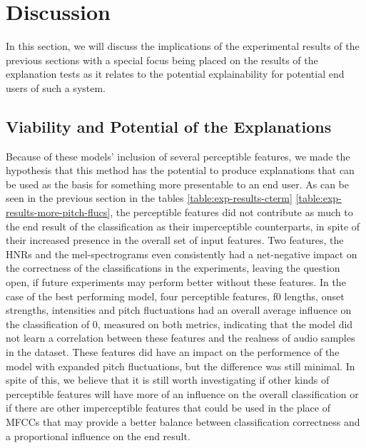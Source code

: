 \documentclass{article}
\begin{document}
	\section{Discussion}
	In this section, we will discuss the implications of the experimental results of the previous
	sections with a special focus being placed on the results of the explanation tests as it
	relates to the potential explainability for potential end users of such a system.
		\subsection{Viability and Potential of the Explanations}
		Because of these models' inclusion of several perceptible features, we made the hypothesis
		that this method has the potential to produce explanations that can be used as the basis
		for something more presentable to an end user. As can be seen in the previous section in
		the tables \ref{table:exp-results-cterm} \ref{table:exp-results-more-pitch-flucs}, the
		perceptible features did not contribute as much to the end result of the classification as
		their imperceptible counterparts, in spite of their increased presence in the overall set
		of input features. Two features, the HNRs and the mel-spectrograms even consistently had a
		net-negative impact on the correctness of the classifications in the experiments, leaving
		the question open, if future experiments may perform better without these features. In the
		case of the best performing model, four perceptible features, f0 lengths, onset strengths,
		intensities and pitch fluctuations had an overall average influence on the classification
		of 0, measured on both metrics, indicating that the model did not learn a correlation
		between these features and the realness of audio samples in the dataset. These features
		did have an impact on the performence of the model with expanded pitch fluctuations, but
		the difference was still minimal. In spite of this, we believe that it is still worth
		investigating if other kinds of perceptible features will have more of an influence on the
		overall classification or if there are other imperceptible features that could be used in
		the place of MFCCs that may provide a better balance between classification correctness
		and a proportional influence on the end result.
\end{document}
